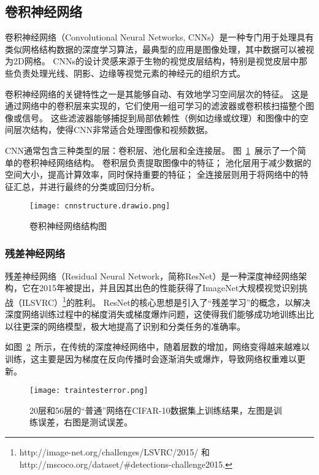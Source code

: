 \subsection{卷积神经网络\cite{lecun1998gradient}}
卷积神经网络（Convolutional Neural Networks, CNNs）是一种专门用于处理具有类似网格结构数据的深度学习算法，最典型的应用是图像处理，其中数据可以被视为2D网格。
CNNs的设计灵感来源于生物的视觉皮层结构，特别是视觉皮层中那些负责处理光线、阴影、边缘等视觉元素的神经元的组织方式。

卷积神经网络的关键特性之一是其能够自动、有效地学习空间层次的特征。
这是通过网络中的卷积层来实现的，它们使用一组可学习的滤波器或卷积核扫描整个图像或信号。
这些滤波器能够捕捉到局部依赖性（例如边缘或纹理）和图像中的空间层次结构，使得CNN非常适合处理图像和视频数据。

CNN通常包含三种类型的层：卷积层、池化层和全连接层。
图~\ref{fig:cnnnetwork}~展示了一个简单的卷积神经网络结构。
卷积层负责提取图像中的特征；
池化层用于减少数据的空间大小，提高计算效率，同时保持重要的特征；
全连接层则用于将网络中的特征汇总，并进行最终的分类或回归分析。

\begin{figure}[htbp]
  \centering
  \texttt{[image: cnnstructure.drawio.png]}
  \caption{卷积神经网络结构图}
  \label{fig:cnnnetwork}
\end{figure}

\subsubsection*{残差神经网络}
残差神经网络（Residual Neural Network，简称ResNet）是一种深度神经网络架构，它在2015年被提出，并且因其出色的性能获得了ImageNet大规模视觉识别挑战（ILSVRC）\footnote{http://image-net.org/challenges/LSVRC/2015/ 和 http://mscoco.org/dataset/\#detections-challenge2015.}的胜利。
ResNet的核心思想是引入了“残差学习”的概念，以解决深度网络训练过程中的梯度消失或梯度爆炸问题，这使得我们能够成功地训练出比以往更深的网络模型，极大地提高了识别和分类任务的准确率。


如图~\ref{fig:traintesterror}~所示，在传统的深度神经网络中，随着层数的增加，网络变得越来越难以训练，这主要是因为梯度在反向传播时会逐渐消失或爆炸，导致网络权重难以更新。


\begin{figure}[htbp]
  \centering
  \texttt{[image: traintesterror.png]}
  \caption{20层和56层的“普通”网络在CIFAR-10数据集上训练结果，左图是训练误差，右图是测试误差\cite{he2016deep}。}
  \label{fig:traintesterror}
\end{figure}

